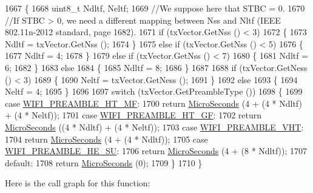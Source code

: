 \begin{DoxyCode}
1667 \{
1668   uint8\_t Ndltf, Neltf;
1669   \textcolor{comment}{//We suppose here that STBC = 0.}
1670   \textcolor{comment}{//If STBC > 0, we need a different mapping between Nss and Nltf (IEEE 802.11n-2012 standard, page 1682).}
1671   \textcolor{keywordflow}{if} (txVector.GetNss () < 3)
1672     \{
1673       Ndltf = txVector.GetNss ();
1674     \}
1675   \textcolor{keywordflow}{else} \textcolor{keywordflow}{if} (txVector.GetNss () < 5)
1676     \{
1677       Ndltf = 4;
1678     \}
1679   \textcolor{keywordflow}{else} \textcolor{keywordflow}{if} (txVector.GetNss () < 7)
1680     \{
1681       Ndltf = 6;
1682     \}
1683   \textcolor{keywordflow}{else}
1684     \{
1685       Ndltf = 8;
1686     \}
1687 
1688   \textcolor{keywordflow}{if} (txVector.GetNess () < 3)
1689     \{
1690       Neltf = txVector.GetNess ();
1691     \}
1692   \textcolor{keywordflow}{else}
1693     \{
1694       Neltf = 4;
1695     \}
1696 
1697   \textcolor{keywordflow}{switch} (txVector.GetPreambleType ())
1698     \{
1699     \textcolor{keywordflow}{case} \hyperlink{group__wifi_gga5e94a56cb338a14ffbbb19c6a41251ebae0944a664debb28943c12d4cd7a81d2a}{WIFI\_PREAMBLE\_HT\_MF}:
1700       \textcolor{keywordflow}{return} \hyperlink{group__timecivil_ga17465a639c8d1464e76538afdd78a9f0}{MicroSeconds} (4 + (4 * Ndltf) + (4 * Neltf));
1701     \textcolor{keywordflow}{case} \hyperlink{group__wifi_gga5e94a56cb338a14ffbbb19c6a41251eba82e0b00d79c1f01b7a6e46b693bafd72}{WIFI\_PREAMBLE\_HT\_GF}:
1702       \textcolor{keywordflow}{return} \hyperlink{group__timecivil_ga17465a639c8d1464e76538afdd78a9f0}{MicroSeconds} ((4 * Ndltf) + (4 * Neltf));
1703     \textcolor{keywordflow}{case} \hyperlink{group__wifi_gga5e94a56cb338a14ffbbb19c6a41251ebab90b0fe0b17f27e51c0fe16239e7b089}{WIFI\_PREAMBLE\_VHT}:
1704       \textcolor{keywordflow}{return} \hyperlink{group__timecivil_ga17465a639c8d1464e76538afdd78a9f0}{MicroSeconds} (4 + (4 * Ndltf));
1705     \textcolor{keywordflow}{case} \hyperlink{group__wifi_gga5e94a56cb338a14ffbbb19c6a41251eba99c3e12c6e91fc9a9bee491d20dab807}{WIFI\_PREAMBLE\_HE\_SU}:
1706       \textcolor{keywordflow}{return} \hyperlink{group__timecivil_ga17465a639c8d1464e76538afdd78a9f0}{MicroSeconds} (4 + (8 * Ndltf));
1707     \textcolor{keywordflow}{default}:
1708       \textcolor{keywordflow}{return} \hyperlink{group__timecivil_ga17465a639c8d1464e76538afdd78a9f0}{MicroSeconds} (0);
1709     \}
1710 \}
\end{DoxyCode}


Here is the call graph for this function\+:




